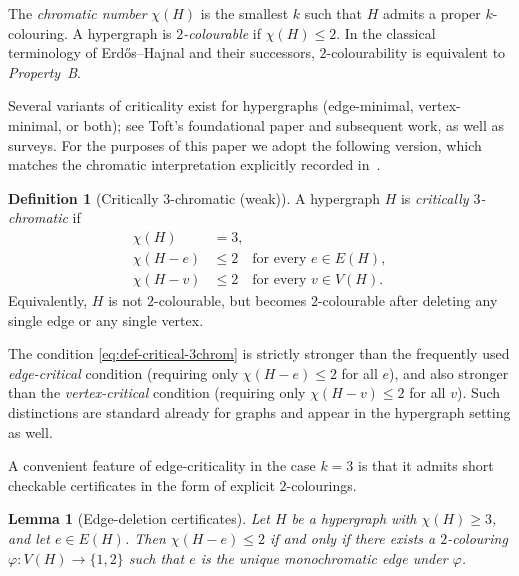 \documentclass[11pt]{amsart}
\newtheorem{lemma}[theorem]{Lemma}
\theoremstyle{definition}
\newtheorem{definition}[theorem]{Definition}
\theoremstyle{remark}
\newcommand{\V}{V}
\newcommand{\E}{E}
\begin{document}
The \emph{chromatic number} $\chi(H)$ is the smallest $k$ such that $H$ admits a proper $k$-colouring.
A hypergraph is \emph{$2$-colourable} if $\chi(H)\le 2$.
In the classical terminology of Erd\H{o}s--Hajnal and their successors, $2$-colourability is equivalent to \emph{Property~B}.\cite{DurajGutowskiKozik2018}

Several variants of criticality exist for hypergraphs (edge-minimal, vertex-minimal, or both); see Toft's foundational paper and subsequent work, as well as surveys.\cite{Toft1974,AbbottHare1999,KostochkaSurvey2006}
For the purposes of this paper we adopt the following version, which matches the chromatic interpretation explicitly recorded in~\cite{ErdosProblems834}.

\begin{definition}[Critically $3$-chromatic (weak)]\label{def:critical-3chrom}
A hypergraph $H$ is \emph{critically $3$-chromatic} if
\begin{equation}\label{eq:def-critical-3chrom}
\begin{aligned}
\chi(H)&=3,\\
\chi(H-e)&\le 2 \quad \text{for every } e\in \E(H),\\
\chi(H-v)&\le 2 \quad \text{for every } v\in \V(H).
\end{aligned}
\end{equation}
Equivalently, $H$ is not $2$-colourable, but becomes $2$-colourable after deleting any single edge or any single vertex.
\end{definition}

The condition \eqref{eq:def-critical-3chrom} is strictly stronger than the frequently used \emph{edge-critical} condition (requiring only $\chi(H-e)\le 2$ for all $e$), and also stronger than the \emph{vertex-critical} condition (requiring only $\chi(H-v)\le 2$ for all $v$).
Such distinctions are standard already for graphs and appear in the hypergraph setting as well.\cite{KostochkaWoodall2000,Toft1974}

A convenient feature of edge-criticality in the case $k=3$ is that it admits short checkable certificates in the form of explicit $2$-colourings.

\begin{lemma}[Edge-deletion certificates]\label{lem:edge-cert}
Let $H$ be a hypergraph with $\chi(H)\ge 3$, and let $e\in \E(H)$.
Then $\chi(H-e)\le 2$ if and only if there exists a $2$-colouring $\varphi:\V(H)\to\{1,2\}$ such that $e$ is the \emph{unique} monochromatic edge under $\varphi$.
\end{lemma}
\end{document}
